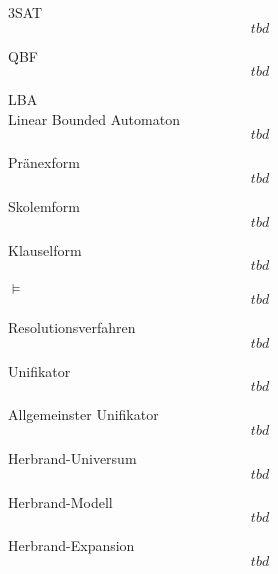 \documentclass[a7paper,print,grid=both]{kartei}
\begin{document}
\begin{karte}{3SAT}
\[tbd\]
\end{karte}
\begin{karte}{QBF}
\[tbd\]
\end{karte}
\begin{karte}{LBA\\Linear Bounded Automaton}
\[tbd\]
\end{karte}
\begin{karte}{Pränexform}
\[tbd\]
\end{karte}
\begin{karte}{Skolemform}
\[tbd\]
\end{karte}
\begin{karte}{Klauselform}
\[tbd\]
\end{karte}
\begin{karte}{$\models$}
\[tbd\]
\end{karte}
\begin{karte}{Resolutionsverfahren}
\[tbd\]
\end{karte}
\begin{karte}{Unifikator}
\[tbd\]
\end{karte}
\begin{karte}{Allgemeinster Unifikator}
\[tbd\]
\end{karte}
\begin{karte}{Herbrand-Universum}
\[tbd\]
\end{karte}
\begin{karte}{Herbrand-Modell}
\[tbd\]
\end{karte}
\begin{karte}{Herbrand-Expansion}
\[tbd\]
\end{karte}
\end{document}
